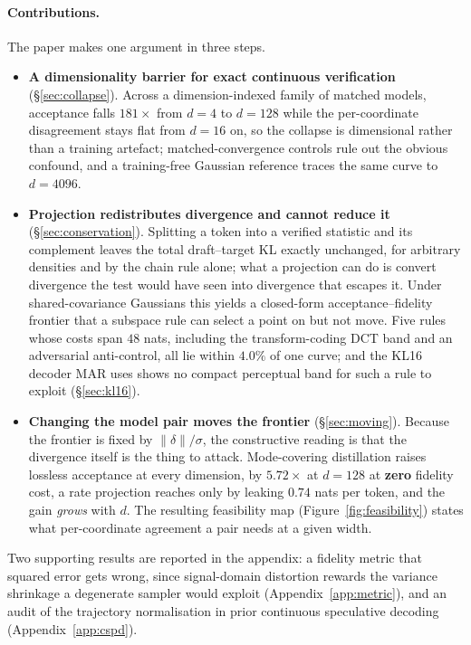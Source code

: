 \documentclass[10pt]{article}
\newcommand{\dd}{d}
\newcommand{\best}[1]{\bm{#1}}
\begin{document}
\paragraph{Contributions.} The paper makes one argument in three steps.

\begin{itemize}
\itemsep2pt
\item \textbf{A dimensionality barrier for exact continuous verification} (\S\ref{sec:collapse}).
Across a dimension-indexed family of matched models, acceptance falls $181\times$ from $\dd{=}4$ to
$\dd{=}128$ while the per-coordinate disagreement stays flat from $\dd{=}16$ on, so the collapse is
dimensional rather than a training artefact; matched-convergence controls rule out the obvious
confound, and a training-free Gaussian reference traces the same curve to $\dd{=}4096$.

\item \textbf{Projection redistributes divergence and cannot reduce it} (\S\ref{sec:conservation}).
Splitting a token into a verified statistic and its complement leaves the total draft--target KL
exactly unchanged, for arbitrary densities and by the chain rule alone; what a projection can do is
convert divergence the test would have seen into divergence that escapes it. Under shared-covariance
Gaussians this yields a closed-form acceptance--fidelity frontier that a subspace rule can select a
point on but not move. Five rules whose costs span $48$ nats, including the transform-coding DCT
band and an adversarial anti-control, all lie within $\best{4.0\%}$ of one curve; and the KL16
decoder MAR uses shows no compact perceptual band for such a rule to exploit (\S\ref{sec:kl16}).

\item \textbf{Changing the model pair moves the frontier} (\S\ref{sec:moving}). Because the frontier
is fixed by $\|\delta\|/\sigma$, the constructive reading is that the divergence itself is the thing
to attack. Mode-covering distillation raises lossless acceptance at every dimension, by
$\best{5.72\times}$ at $\dd{=}128$ at \textbf{zero} fidelity cost, a rate projection reaches only by
leaking $0.74$ nats per token, and the gain \emph{grows} with $\dd$. The resulting feasibility map
(Figure~\ref{fig:feasibility}) states what per-coordinate agreement a pair needs at a given width.
\end{itemize}

Two supporting results are reported in the appendix: a fidelity metric that squared error gets
wrong, since signal-domain distortion rewards the variance shrinkage a degenerate sampler would
exploit (Appendix~\ref{app:metric}), and an audit of the trajectory normalisation in prior
continuous speculative decoding (Appendix~\ref{app:cspd}).
\end{document}
